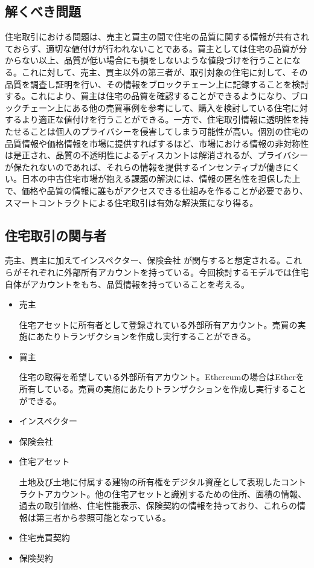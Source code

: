 \documentclass[a4paper,11pt]{jlreq}
\begin{document}
\subsection{解くべき問題}
住宅取引における問題は、売主と買主の間で住宅の品質に関する情報が共有されておらず、適切な値付けが行われないことである。買主としては住宅の品質が分からない以上、品質が低い場合にも損をしないような値段づけを行うことになる。これに対して、売主、買主以外の第三者が、取引対象の住宅に対して、その品質を調査し証明を行い、その情報をブロックチェーン上に記録することを検討する。これにより、買主は住宅の品質を確認することができるようになり、ブロックチェーン上にある他の売買事例を参考にして、購入を検討している住宅に対するより適正な値付けを行うことができる。一方で、住宅取引情報に透明性を持たせることは個人のプライバシーを侵害してしまう可能性が高い。個別の住宅の品質情報や価格情報を市場に提供すればするほど、市場における情報の非対称性は是正され、品質の不透明性によるディスカントは解消されるが、プライバシーが保たれないのであれば、それらの情報を提供するインセンティブが働きにくい。日本の中古住宅市場が抱える課題の解決には、情報の匿名性を担保した上で、価格や品質の情報に誰もがアクセスできる仕組みを作ることが必要であり、スマートコントラクトによる住宅取引は有効な解決策になり得る。

\subsection{住宅取引の関与者}
売主、買主に加えてインスペクター、保険会社%
が関与すると想定される。これらがそれぞれに外部所有アカウントを持っている。今回検討するモデルでは住宅自体がアカウントをもち、品質情報を持っていることを考える。
\begin{itemize}
	\item 売主
    \par 住宅アセットに所有者として登録されている外部所有アカウント。売買の実施にあたりトランザクションを作成し実行することができる。
    \item 買主
    \par 住宅の取得を希望している外部所有アカウント。Ethereumの場合はEtherを所有している。売買の実施にあたりトランザクションを作成し実行することができる。
    \item インスペクター
    \par 
    \item 保険会社
	\item 住宅アセット	
	\par 土地及び土地に付属する建物の所有権をデジタル資産として表現したコントラクトアカウント。他の住宅アセットと識別するための住所、面積の情報、過去の取引価格、住宅性能表示、保険契約の情報を持っており、これらの情報は第三者から参照可能となっている。
	\item 住宅売買契約
	\item 保険契約

\end{itemize}
\end{document}
